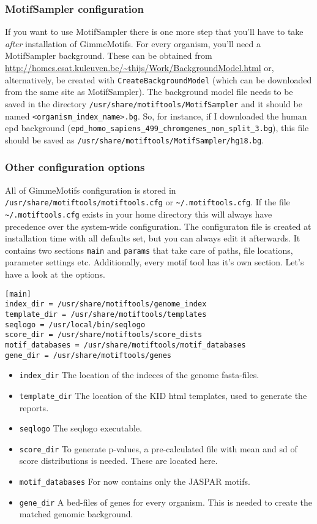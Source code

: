 \documentclass[10pt]{article}
\begin{document}
\subsubsection{MotifSampler configuration}
\label{sec:MotifSampler}
If you want to use MotifSampler there is one more step that you'll have to take \emph{after} installation of GimmeMotifs. For every organism, you'll need a MotifSampler background. These can be obtained from \url{http://homes.esat.kuleuven.be/~thijs/Work/BackgroundModel.html} or, alternatively, be created with \texttt{CreateBackgroundModel} (which can be downloaded from the same site as MotifSampler). The background model file needs to be saved in the directory \texttt{/usr/share/motiftools/MotifSampler} and it should be named \texttt{<organism\_index\_name>.bg}. So, for instance, if I downloaded the human epd background (\texttt{epd\_homo\_sapiens\_499\_chromgenes\_non\_split\_3.bg}), this file should be saved as \texttt{/usr/share/motiftools/MotifSampler/hg18.bg}.

\subsubsection{Other configuration options}
All of GimmeMotifs configuration is stored in \texttt{/usr/share/motiftools/motiftools.cfg} or \texttt{\textasciitilde{}/.motiftools.cfg}. If the file \texttt{\textasciitilde{}/.motiftools.cfg} exists in your home directory this will always have precedence over the system-wide configuration.
The configuraton file is created at installation time with all defaults set, but you can always edit it afterwards. It contains two sections \texttt{main} and \texttt{params} that take care of paths, file locations, parameter settings etc. Additionally, every motif tool has it's own section.
Let's have a look at the options.
\begin{verbatim}
[main]
index_dir = /usr/share/motiftools/genome_index
template_dir = /usr/share/motiftools/templates
seqlogo = /usr/local/bin/seqlogo
score_dir = /usr/share/motiftools/score_dists
motif_databases = /usr/share/motiftools/motif_databases
gene_dir = /usr/share/motiftools/genes
\end{verbatim}
\begin{itemize}
 \item \texttt{index\_dir} The location of the indeces of the genome fasta-files.
 \item \texttt{template\_dir} The location of the KID html templates, used to generate the reports.
 \item \texttt{seqlogo} The seqlogo executable.
 \item \texttt{score\_dir} To generate p-values, a pre-calculated file with mean and sd of score distributions is needed. These are located here.
 \item \texttt{motif\_databases} For now contains only the JASPAR motifs.
 \item \texttt{gene\_dir} A bed-files of genes for every organism. This is needed to create the matched genomic background.
\end{itemize}
\end{document}
